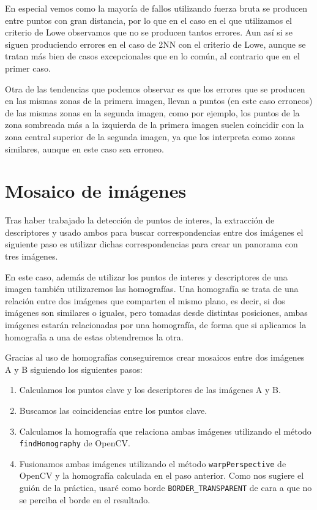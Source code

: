 \documentclass[12pt, spanish]{article}
\begin{document}
En especial vemos como la mayoría de fallos utilizando fuerza bruta se producen entre puntos con gran distancia, por lo que en el caso en el que utilizamos el criterio de Lowe observamos que no se producen tantos errores. Aun así si se siguen produciendo errores en el caso de 2NN con el criterio de Lowe, aunque se tratan más bien de casos excepcionales que en lo común, al contrario que en el primer caso.

Otra de las tendencias que podemos observar es que los errores que se producen en las mismas zonas de la primera imagen, llevan a puntos (en este caso erroneos) de las mismas zonas en la segunda imagen, como por ejemplo, los puntos de la zona sombreada más a la izquierda de la primera imagen suelen coincidir con la zona central superior de la segunda imagen, ya que los interpreta como zonas similares, aunque en este caso sea erroneo.


\newpage

\section{Mosaico de imágenes}

Tras haber trabajado la detección de puntos de interes, la extracción de descriptores y usado ambos para buscar correspondencias entre dos imágenes el siguiente paso es utilizar dichas correspondencias para crear un panorama con tres imágenes.

En este caso, además de utilizar los puntos de interes y descriptores de una imagen también utilizaremos las homografías. Una homografía se trata de una relación entre dos imágenes que comparten el mismo plano, es decir, si dos imágenes son similares o iguales, pero tomadas desde distintas posiciones, ambas imágenes estarán relacionadas por una homografía, de forma que si aplicamos la homografía a una de estas obtendremos la otra.

Gracias al uso de homografías conseguiremos crear mosaicos entre dos imágenes A y B siguiendo los siguientes pasos:

\begin{enumerate}
	\item Calculamos los puntos clave y los descriptores de las imágenes A y B.
	\item Buscamos las coincidencias entre los puntos clave.
	\item Calculamos la homografía que relaciona ambas imágenes utilizando el método\\ \texttt{findHomography}\cite{findHomography} de OpenCV.
	\item Fusionamos ambas imágenes utilizando el método \texttt{warpPerspective}\cite{warpPerspective} de OpenCV y la homografía calculada en el paso anterior. Como nos sugiere el guión de la práctica, usaré como borde \texttt{BORDER\_TRANSPARENT} de cara a que no se perciba el borde en el resultado.
\end{enumerate}
\end{document}
